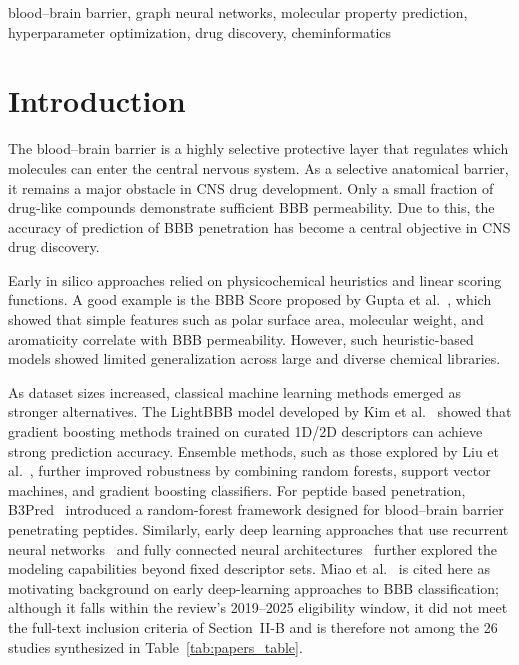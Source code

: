 \documentclass[conference]{IEEEtran}
\begin{document}
\begin{IEEEkeywords}
blood–brain barrier, graph neural networks, molecular property prediction,
hyperparameter optimization, drug discovery, cheminformatics
\end{IEEEkeywords}

\section{Introduction}

The blood–brain barrier is a highly selective protective layer that
regulates which molecules can enter the central nervous system. As a selective anatomical barrier, it remains a major obstacle in CNS drug development. Only a small fraction of drug-like compounds demonstrate sufficient BBB permeability. Due to this,
the accuracy of prediction of BBB penetration has become a central
objective in CNS drug discovery.

Early in silico approaches relied on physicochemical heuristics and
linear scoring functions. A good example is the BBB Score proposed by
Gupta et al.~\cite{Gupta2019}, which showed that simple features such
as polar surface area, molecular weight, and aromaticity correlate with
BBB permeability. However, such heuristic-based models showed limited generalization across large and diverse chemical libraries.

As dataset sizes increased, classical machine learning methods emerged as stronger alternatives. The LightBBB model developed by Kim et
al.~\cite{Shaker2021} showed that gradient boosting methods trained on
curated 1D/2D descriptors can achieve strong prediction accuracy.
Ensemble methods, such as those explored by Liu et
al.~\cite{Liu2021}, further improved robustness by combining random
forests, support vector machines, and gradient boosting classifiers.
For peptide based penetration, B3Pred~\cite{Kumar2021} introduced a
random-forest framework designed for blood–brain barrier penetrating
peptides. Similarly, early deep learning approaches that use recurrent
neural networks~\cite{Alsenan2020} and fully connected neural
architectures~\cite{Miao2019} further explored the modeling
capabilities beyond fixed descriptor sets. Miao et al.~\cite{Miao2019} is cited here as motivating background on
early deep-learning approaches to BBB classification; although it falls
within the review's 2019--2025 eligibility window, it did not meet the
full-text inclusion criteria of Section~II-B and is therefore not among
the 26 studies synthesized in Table~\ref{tab:papers_table}.
\end{document}
